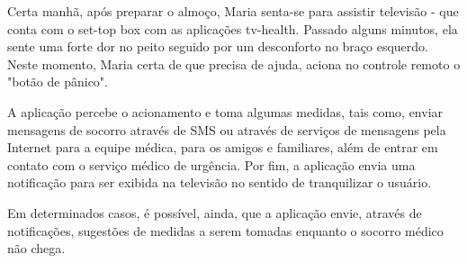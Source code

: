 Certa manhã, após preparar o almoço, Maria senta-se para assistir televisão -
que conta com o set-top box com as aplicações tv-health. Passado
alguns minutos, ela sente uma forte dor no peito seguido por um desconforto no
braço esquerdo. Neste momento, Maria certa de que precisa de ajuda, aciona no
controle remoto o "botão de pânico".

A aplicação percebe o acionamento e toma algumas medidas, tais como, enviar
mensagens de socorro através de SMS ou através de serviços de mensagens pela
Internet para a equipe médica, para os amigos e familiares, além de entrar em
contato com o serviço médico de urgência. Por fim, a aplicação envia uma
notificação para ser exibida na televisão no sentido de tranquilizar o usuário.

Em determinados casos, é possível, ainda, que a aplicação envie, através de
notificações, sugestões de medidas a serem tomadas enquanto o socorro médico não
chega.
